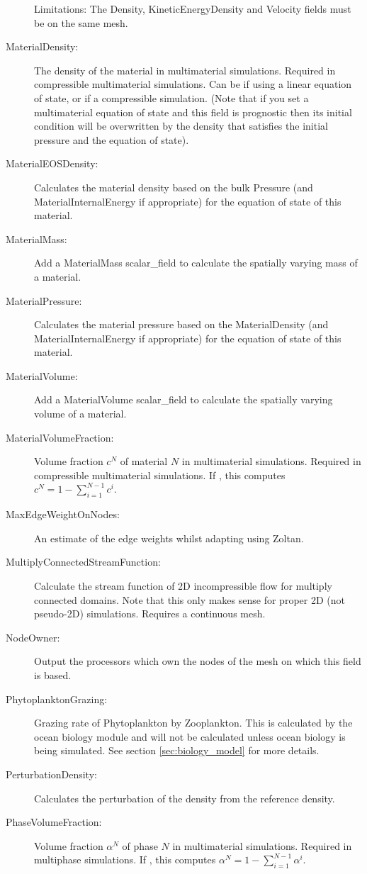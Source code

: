 \begin{description}
	Limitations: The Density, KineticEnergyDensity and Velocity fields must be on the same mesh.
\item[MaterialDensity:]The density of the material in multimaterial simulations. Required in compressible multimaterial simulations. Can be  if using a linear equation of state, or  if a compressible simulation. (Note that if you set a multimaterial equation of state and this field is prognostic then its initial condition will be overwritten by the density that satisfies the initial pressure and the equation of state).
\item[MaterialEOSDensity:]Calculates the material density based on the bulk Pressure (and MaterialInternalEnergy if appropriate) for the equation of state of this material.
\item[MaterialMass:]Add a MaterialMass scalar\_field to calculate the spatially varying mass of a material.
\item[MaterialPressure:] Calculates the material pressure based on the MaterialDensity (and MaterialInternalEnergy if appropriate) for the equation of state of this material.
\item[MaterialVolume:]Add a MaterialVolume scalar\_field to calculate the spatially varying volume of a material.
\item[MaterialVolumeFraction:]Volume fraction $c^N$ of material $N$ in multimaterial simulations. Required in compressible multimaterial simulations. If , this computes $c^N = 1 - \sum_{i=1}^{N-1}c^i$.
\item[MaxEdgeWeightOnNodes:]An estimate of the edge weights whilst adapting using Zoltan.
\item[MultiplyConnectedStreamFunction:]Calculate the stream function of 2D incompressible flow for multiply connected domains. Note that this only makes sense for proper 2D (not pseudo-2D) simulations. Requires a continuous mesh.
\item[NodeOwner:]Output the processors which own the nodes of the mesh on which this field is based.
\item[PhytoplanktonGrazing:]Grazing rate of Phytoplankton by Zooplankton. This is calculated by the ocean biology module and will not be calculated unless ocean biology is being simulated. See section \ref{sec:biology_model} for more details.
\item[PerturbationDensity:]Calculates the perturbation of the density from the reference density.
\item[PhaseVolumeFraction:]Volume fraction $\alpha^N$ of phase $N$ in multimaterial simulations. Required in multiphase simulations. If , this computes $\alpha^N = 1 - \sum_{i=1}^{N-1}\alpha^i$.

\end{description}
